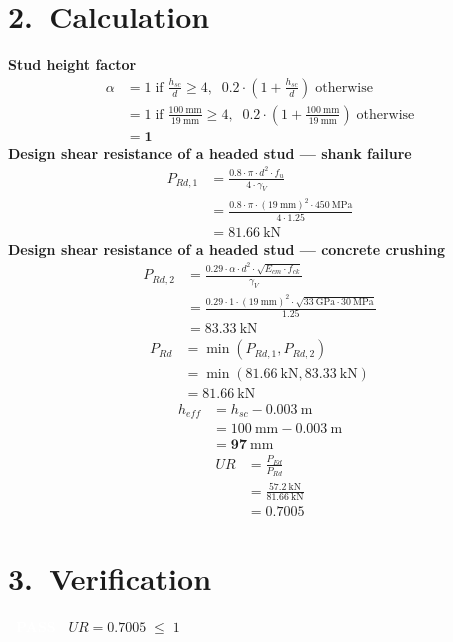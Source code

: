 \documentclass[11pt,a4paper]{article}
\newcommand{\calccheckpass}[1]{\noindent\colorbox{PassGreen}{\textcolor{white}{\textbf{~PASS~}}}\; #1}
\begin{document}
\section*{\color{BrandPrimary}2.\ Calculation}
\noindent\textbf{Stud height factor}
\begin{align*}
\alpha &= 1 \;\mathrm{if}\; \frac{h_{sc}}{d} \geq 4,\;\; 0.2 \cdot \left(1 + \frac{h_{sc}}{d}\right) \;\mathrm{otherwise} \\
&= 1 \;\mathrm{if}\; \frac{100\ \mathrm{mm}}{19\ \mathrm{mm}} \geq 4,\;\; 0.2 \cdot \left(1 + \frac{100\ \mathrm{mm}}{19\ \mathrm{mm}}\right) \;\mathrm{otherwise} \\
&= \mathbf{1}
\end{align*}
\noindent\textbf{Design shear resistance of a headed stud — shank failure}
\begin{align*}
P_{Rd,1} &= \frac{0.8 \cdot \pi \cdot d^{2} \cdot f_{u}}{4 \cdot \gamma_{V}} \\
&= \frac{0.8 \cdot \pi \cdot \left(19\ \mathrm{mm}\right)^{2} \cdot 450\ \mathrm{MPa}}{4 \cdot 1.25} \\
&= \mathbf{81.66}\ \mathrm{kN}
\end{align*}
\noindent\textbf{Design shear resistance of a headed stud — concrete crushing}
\begin{align*}
P_{Rd,2} &= \frac{0.29 \cdot \alpha \cdot d^{2} \cdot \sqrt{E_{cm} \cdot f_{ck}}}{\gamma_{V}} \\
&= \frac{0.29 \cdot 1 \cdot \left(19\ \mathrm{mm}\right)^{2} \cdot \sqrt{33\ \mathrm{GPa} \cdot 30\ \mathrm{MPa}}}{1.25} \\
&= \mathbf{83.33}\ \mathrm{kN}
\end{align*}
\begin{align*}
P_{Rd} &= \min\left(P_{Rd,1}, P_{Rd,2}\right) \\
&= \min\left(81.66\ \mathrm{kN}, 83.33\ \mathrm{kN}\right) \\
&= \mathbf{81.66}\ \mathrm{kN}
\end{align*}
\begin{align*}
h_{eff} &= h_{sc} - 0.003\ \mathrm{m} \\
&= 100\ \mathrm{mm} - 0.003\ \mathrm{m} \\
&= \mathbf{97}\ \mathrm{mm}
\end{align*}
\begin{align*}
UR &= \frac{P_{Ed}}{P_{Rd}} \\
&= \frac{57.2\ \mathrm{kN}}{81.66\ \mathrm{kN}} \\
&= \mathbf{0.7005}
\end{align*}
\section*{\color{BrandPrimary}3.\ Verification}
\calccheckpass{$UR = 0.7005 \; \le \; 1$}\par\vspace{4pt}
\end{document}
